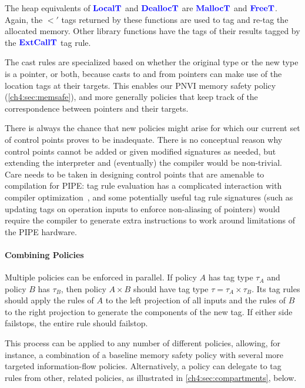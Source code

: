 The heap equivalents of \(\color{blue} \mathbf{LocalT}\) and \(\color{blue} \mathbf{DeallocT}\) are \(\color{blue} \mathbf{MallocT}\) and
\(\color{blue} \mathbf{FreeT}\). Again, the \(\lt'\) tags returned by these functions are used
to tag and re-tag the allocated memory.
Other library functions have the tags of their results tagged
by the \(\color{blue} \mathbf{ExtCallT}\) tag rule.

The cast rules are specialized based on whether the original type or the new type
is a pointer, or both, because casts to and from pointers can make use of the
location tags at their targets. This enables our PNVI memory safety policy (\cref{ch4:sec:memsafe}), and
more generally policies that keep track of the correspondence between pointers and their
targets.

There is always the chance that new policies might arise for which our current set of
control points proves to be inadequate. There is no conceptual reason why
control points cannot be added or given modified signatures as needed,
but extending the interpreter and (eventually) the compiler would be non-trivial.
Care needs to be taken in designing control points that are amenable
to compilation for PIPE: tag rule evaluation has a complicated interaction with
compiler optimization~\cite{Chhak21:Tagine}, and some potentially useful tag
rule signatures (such as updating tags on operation inputs to enforce non-aliasing of pointers)
would require the compiler to generate extra instructions to work
around limitations of the PIPE hardware.

\paragraph{Combining Policies}

Multiple policies can be enforced in parallel. If policy \(A\) has tag type \(\tau_A\)
and policy \(B\) has \(\tau_B\), then policy \(A \times B\) should have tag type
\(\tau = \tau_A \times \tau_B\). Its tag rules should apply the rules of \(A\) to
the left projection of all inputs and the rules of \(B\) to the right projection
to generate the components of the new tag. If either side failstops, the entire
rule should failstop.

This process can be applied to any number of different policies, allowing, for instance,
a combination of a baseline memory safety policy with several more targeted
information-flow policies. Alternatively, a policy can delegate to tag rules
from other, related policies, as illustrated in \cref{ch4:sec:compartments}, below.

